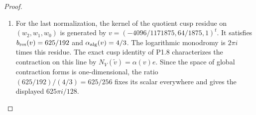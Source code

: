 \begin{proof}
\begin{enumerate}[label=\arabic*.]
\item For the last normalization, the kernel of the quotient cusp residue
on $(w_2,w_1,w_0)$ is generated by
$v=(-4096/1171875,64/1875,1)^t$.
It satisfies $b_{\rm res}(v)=625/192$ and
$\alpha_{\rm alg}(v)=4/3$.
The logarithmic monodromy is $2\pi i$ times this residue.
The exact cusp identity of P1.8 characterizes the contraction on this
line by $N_V(\widetilde v)=\alpha(v)e$.
Since the space of global contraction forms is one-dimensional, the
ratio $(625/192)/(4/3)=625/256$ fixes its scalar everywhere and gives
the displayed $625\pi i/128$.

\end{enumerate}
\end{proof}